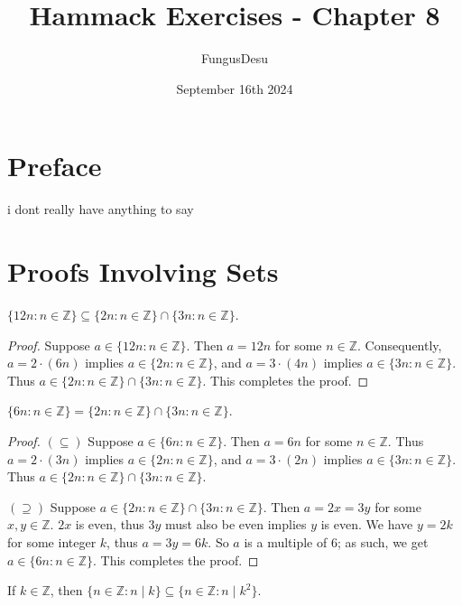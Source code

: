 \documentclass{exam}
\title{Hammack Exercises - Chapter 8}
\author{FungusDesu}
\date{September 16th 2024}
\begin{document}
\maketitle

\section{Preface}
i dont really have anything to say

\section{Proofs Involving Sets}

\begin{proposition}{8.1}
    $\{12n:n\in\mathbb Z\}\subseteq\{2n:n\in\mathbb Z\} \cap \{3n:n\in\mathbb Z\}$.
\end{proposition}

\begin{proof}
    Suppose $a\in\{12n:n\in\mathbb Z\}$. Then $a = 12n$ for some $n\in\mathbb Z$. Consequently, $a=2\cdot(6n)$ implies $a\in\{2n:n\in\mathbb Z\}$, and $a = 3\cdot(4n)$ implies $a\in\{3n:n\in\mathbb Z\}$. Thus $a\in\{2n:n\in\mathbb Z\} \cap \{3n:n\in\mathbb Z\}$. This completes the proof.
\end{proof}

\begin{proposition}{8.2}
    $\{6n:n\in\mathbb Z\}=\{2n:n\in\mathbb Z\} \cap \{3n:n\in\mathbb Z\}$.
\end{proposition}

\begin{proof}
    $(\subseteq)$ Suppose $a\in\{6n:n\in\mathbb Z\}$. Then $a = 6n$ for some $n\in\mathbb Z$. Thus $a = 2\cdot(3n)$ implies $a\in\{2n:n\in\mathbb Z\}$, and $a=3\cdot(2n)$ implies $a\in\{3n:n\in\mathbb Z\}$. Thus $a\in\{2n:n\in\mathbb Z\}\cap\{3n:n\in\mathbb Z\}$.

    $(\supseteq)$ Suppose $a\in\{2n:n\in\mathbb Z\}\cap\{3n:n\in\mathbb Z\}$. Then $a = 2x = 3y$ for some $x,y\in\mathbb Z$. $2x$ is even, thus $3y$ must also be even implies $y$ is even. We have $y = 2k$ for some integer $k$, thus $a = 3y = 6k$. So $a$ is a multiple of 6; as such, we get $a\in\{6n:n\in\mathbb Z\}$. This completes the proof.
\end{proof}

\begin{proposition}{8.3}
    If $k\in\mathbb Z$, then $\{n\in\mathbb Z:n\mid k\}\subseteq\{n\in\mathbb Z: n\mid k^2\}$.
\end{proposition}
\end{document}
